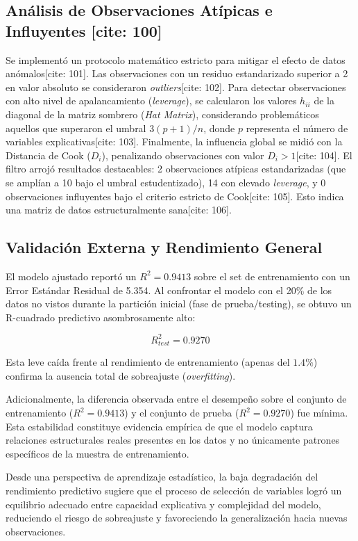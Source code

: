\documentclass[conference]{IEEEtran}
\begin{document}
\subsection{Análisis de Observaciones Atípicas e Influyentes [cite: 100]}
Se implementó un protocolo matemático estricto para mitigar el efecto de datos anómalos[cite: 101]. Las observaciones con un residuo estandarizado superior a 2 en valor absoluto se consideraron \textit{outliers}[cite: 102]. Para detectar observaciones con alto nivel de apalancamiento (\textit{leverage}), se calcularon los valores $h_{ii}$ de la diagonal de la matriz sombrero (\textit{Hat Matrix}), considerando problemáticos aquellos que superaron el umbral $3(p + 1)/n$, donde $p$ representa el número de variables explicativas[cite: 103]. Finalmente, la influencia global se midió con la Distancia de Cook ($D_{i}$), penalizando observaciones con valor $D_{i} > 1$[cite: 104]. El filtro arrojó resultados destacables: 2 observaciones atípicas estandarizadas (que se amplían a 10 bajo el umbral estudentizado), 14 con elevado \textit{leverage}, y 0 observaciones influyentes bajo el criterio estricto de Cook[cite: 105]. Esto indica una matriz de datos estructuralmente sana[cite: 106].

\subsection{Validación Externa y Rendimiento General}
El modelo ajustado reportó un $R^2 = 0.9413$ sobre el set de entrenamiento con un Error Estándar Residual de 5.354. Al confrontar el modelo con el 20\% de los datos no vistos durante la partición inicial (fase de prueba/testing), se obtuvo un R-cuadrado predictivo asombrosamente alto:

\begin{equation}
R^2_{test} = 0.9270
\end{equation}

Esta leve caída frente al rendimiento de entrenamiento (apenas del $1.4\%$) confirma la ausencia total de sobreajuste (\textit{overfitting}).

Adicionalmente, la diferencia observada entre el desempeño
sobre el conjunto de entrenamiento ($R^2=0.9413$) y el
conjunto de prueba ($R^2=0.9270$) fue mínima. Esta
estabilidad constituye evidencia empírica de que el modelo
captura relaciones estructurales reales presentes en los datos
y no únicamente patrones específicos de la muestra de
entrenamiento.

Desde una perspectiva de aprendizaje estadístico, la baja
degradación del rendimiento predictivo sugiere que el proceso
de selección de variables logró un equilibrio adecuado entre
capacidad explicativa y complejidad del modelo, reduciendo el
riesgo de sobreajuste y favoreciendo la generalización hacia
nuevas observaciones.
\end{document}
